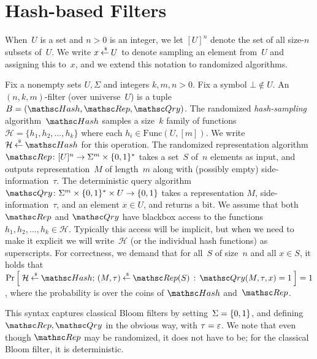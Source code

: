 \section{Hash-based Filters}
When~$U$ is a set and $n>0$ is an integer, we let $[U]^n$ denote the set of all size-$n$ subsets of~$U$.
We write $x {\:\stackrel{{\scriptscriptstyle \hspace{0.2em}\$}} {\leftarrow}\:} U$ to denote sampling an element from~$U$ and assigning this to~$x$, and we extend this notation to randomized algorithms.

Fix a nonempty sets $U,\Sigma$ and integers $k,m,n>0$.  Fix a symbol $\bot \not\in U$.  An $(n,k,m)$-filter (over universe~$U$) is a tuple  $B=(\Hash,\Rep,\Qry)$.
%
The randomized \emph{hash-sampling} algorithm~$\Hash$ samples a
size~$k$  family of functions~$\mathcal{H}=\{h_1,h_2,\ldots,h_k\}$
where each $h_i \in  \mathrm{Func}(U,[m])$.  We write $\mathcal{H}
\getsr \Hash$ for this operation.
%
The randomized representation algorithm $\Rep\colon [U]^n \rightarrow
\Sigma^m \times \bits^*$ takes a set~$S$ of~$n$ elements as input, and outputs
representation~$M$ of length~$m$ along with (possibly empty) side-information~$\tau$.
%
The deterministic query algorithm $\Qry\colon \Sigma^m \times \bits^* \times U
\rightarrow \bits$ takes a representation $M$, side-information~$\tau$, and an element $x \in
U$, and returns a bit.
%
We assume that both $\Rep$ and $\Qry$ have blackbox access to the
functions $h_1,h_2,\ldots,h_k \in \mathcal{H}$.  Typically this access will be implicit, but when we need to make it explicit we will write~$\mathcal{H}$ (or the individual hash functions) as superscripts.
%
For correctness, we demand that for all~$S$ of size~$n$ and all $x
\in S$, it holds that $\Prob{\mathcal{H}\getsr\Hash;\,(M,\tau)\getsr\Rep(S)\,:\,\Qry(M,\tau,x)=1}=1$, where the
probability is over the coins of $\Hash$ and~$\Rep$.


This syntax captures classical Bloom filters by setting~$\Sigma=\{0,1\}$,  and defining $\Rep,\Qry$ in the obvious way, with $\tau=\varepsilon$. We note that even though $\Rep$ may be randomized, it does not have to be; for the classical Bloom filter, it is deterministic.

